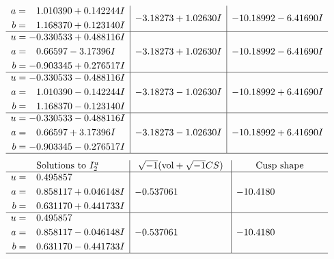 \documentclass[1p]{elsarticle_modified}
\theoremstyle{definition}
\newcommand{\I}{\sqrt{-1}}
\begin{document}
$$\begin{array}{c|c|c}
\begin{aligned}
a &= \phantom{-}1.010390 + 0.142244 I \\
b &= \phantom{-}1.168370 + 0.123140 I\end{aligned}
 & -3.18273 + 1.02630 I & -10.18992 - 6.41690 I \\ \hline\begin{aligned}
u &= -0.330533 + 0.488116 I \\
a &= \phantom{-}0.66597 - 3.17396 I \\
b &= -0.903345 + 0.276517 I\end{aligned}
 & -3.18273 + 1.02630 I & -10.18992 - 6.41690 I \\ \hline\begin{aligned}
u &= -0.330533 - 0.488116 I \\
a &= \phantom{-}1.010390 - 0.142244 I \\
b &= \phantom{-}1.168370 - 0.123140 I\end{aligned}
 & -3.18273 - 1.02630 I & -10.18992 + 6.41690 I \\ \hline\begin{aligned}
u &= -0.330533 - 0.488116 I \\
a &= \phantom{-}0.66597 + 3.17396 I \\
b &= -0.903345 - 0.276517 I\end{aligned}
 & -3.18273 - 1.02630 I & -10.18992 + 6.41690 I\\
 \hline 
 \end{array}$$\newpage$$\begin{array}{c|c|c}  
\text{Solutions to }I^u_{2}& \I (\text{vol} + \sqrt{-1}CS) & \text{Cusp shape}\\
 \hline 
\begin{aligned}
u &= \phantom{-}0.495857\phantom{ +0.000000I} \\
a &= \phantom{-}0.858117 + 0.046148 I \\
b &= \phantom{-}0.631170 + 0.441733 I\end{aligned}
 & -0.537061\phantom{ +0.000000I} & -10.4180\phantom{ +0.000000I} \\ \hline\begin{aligned}
u &= \phantom{-}0.495857\phantom{ +0.000000I} \\
a &= \phantom{-}0.858117 - 0.046148 I \\
b &= \phantom{-}0.631170 - 0.441733 I\end{aligned}
 & -0.537061\phantom{ +0.000000I} & -10.4180\phantom{ +0.000000I}\\
 \hline 
 \end{array}$$\newpage\newpage\renewcommand{\arraystretch}{1}
\end{document}
